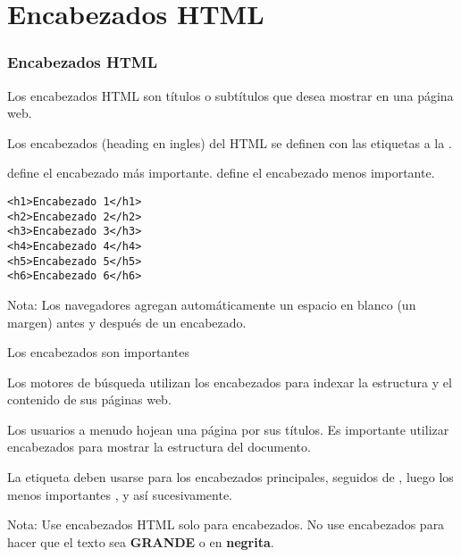 
\section{Encabezados HTML}

\begin{frame}[fragile]
  \frametitle{Encabezados HTML}

  Los encabezados HTML son títulos o subtítulos que desea
  mostrar en una página web.

  \vspace{\baselineskip}
  Los encabezados (heading en ingles) del HTML se definen con
  las etiquetas  a la .

  \vspace{\baselineskip}
   define el encabezado más importante.
   define el encabezado menos importante.

  \vspace{\baselineskip}
  \begin{lstlisting}
<h1>Encabezado 1</h1>
<h2>Encabezado 2</h2>
<h3>Encabezado 3</h3>
<h4>Encabezado 4</h4>
<h5>Encabezado 5</h5>
<h6>Encabezado 6</h6>
  \end{lstlisting}

  \begin{exampleblock}{Nota:}
    Los navegadores agregan automáticamente un espacio en blanco
    (un margen) antes y después de un encabezado.
  \end{exampleblock}
\end{frame}

\begin{frame}[c]{Los encabezados son importantes}

  Los motores de búsqueda utilizan los encabezados para indexar
  la estructura y el contenido de sus páginas web.

  \vspace{\baselineskip}
  Los usuarios a menudo hojean una página por sus títulos.
  Es importante utilizar encabezados para mostrar la estructura
  del documento.

  \vspace{\baselineskip}
  La etiqueta  deben usarse para los encabezados principales,
  seguidos de , luego los menos importantes
  , y así sucesivamente.

  \begin{block}{Nota:}
    Use encabezados HTML solo para encabezados.
    No use encabezados para hacer que el texto sea \textbf{GRANDE}
    o en \textbf{negrita}.
  \end{block}
\end{frame}

